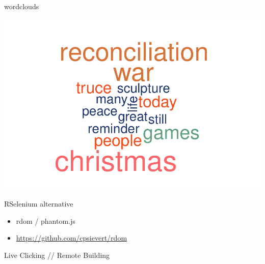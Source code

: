 \documentclass[ignorenonframetext,]{beamer}
\providecommand{\tightlist}{%
  \setlength{\itemsep}{0pt}\setlength{\parskip}{0pt}}
\begin{document}
\begin{frame}{wordclouds}

\includegraphics{wc1999.pdf}

\end{frame}

\begin{frame}{RSelenium alternative}

\begin{itemize}
\tightlist
\item
  rdom / phantom.js
\item
  \url{https://github.com/cpsievert/rdom}
\end{itemize}

\end{frame}

\begin{frame}{Live Clicking // Remote Building}

\end{frame}
\end{document}
